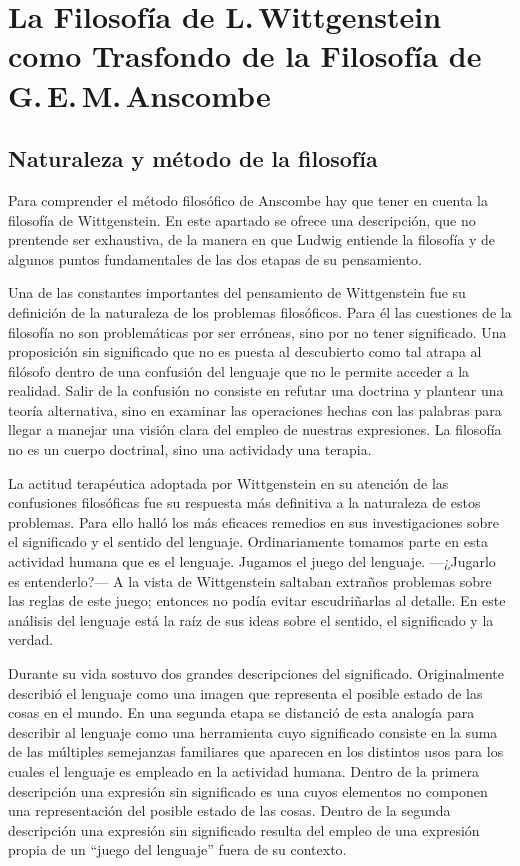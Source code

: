 \section{La Filosofía de L.\,Wittgenstein como Trasfondo de la Filosofía de G.\,E.\,M.\,Anscombe}

\subsection{Naturaleza y método de la filosofía}

Para comprender el método filosófico de Anscombe hay que tener en cuenta la filosofía de Wittgenstein. En este apartado se ofrece una descripción, que no prentende ser exhaustiva, de la manera en que Ludwig entiende la filosofía y de algunos puntos fundamentales de las dos etapas de su pensamiento.

Una de las constantes importantes del pensamiento de Wittgenstein fue su definición de la naturaleza de los problemas filosóficos. Para él las cuestiones de la filosofía no son problemáticas por ser erróneas, sino por no tener significado.\autocite[Cf.~][\S4.003]{wittgenstein1922tractatuses} Una proposición sin significado que no es puesta al descubierto como tal atrapa al filósofo dentro de una confusión del lenguaje que no le permite acceder a la realidad. Salir de la confusión no consiste en refutar una doctrina y plantear una teoría alternativa, sino en examinar las operaciones hechas con las palabras para llegar a manejar una visión clara del empleo de nuestras expresiones. La filosofía no es un cuerpo doctrinal, sino una actividad\autocite[Cf.~][\S4.112]{wittgenstein1922tractatuses}y una terapia\autocite[Cf.~][\S133]{wittgenstein1953phiinv}.

La actitud terapéutica adoptada por Wittgenstein en su atención de las confusiones filosóficas fue su respuesta más definitiva a la naturaleza de estos problemas. Para ello halló los más eficaces remedios en sus investigaciones sobre el significado y el sentido del lenguaje. Ordinariamente tomamos parte en esta actividad humana que es el lenguaje. Jugamos el juego del lenguaje. ---¿Jugarlo es entenderlo?--- A la vista de Wittgenstein saltaban extraños problemas sobre las reglas de este juego; entonces no podía evitar escudriñarlas al detalle.\autocite[Cf.~][356]{monk1991duty} En este análisis del lenguaje está la raíz de sus ideas sobre el sentido, el significado y la verdad.

Durante su vida sostuvo dos grandes descripciones del significado. Originalmente describió el lenguaje como una imagen que representa el posible estado de las cosas en el mundo. En una segunda etapa se distanció de esta analogía para describir al lenguaje como una herramienta cuyo significado consiste en la suma de las múltiples semejanzas familiares que aparecen en los distintos usos para los cuales el lenguaje es empleado en la actividad humana. Dentro de la primera descripción una expresión sin significado es una cuyos elementos no componen una representación del posible estado de las cosas. Dentro de la segunda descripción una expresión sin significado resulta del empleo de una expresión propia de un ``juego del lenguaje'' fuera de su contexto.

